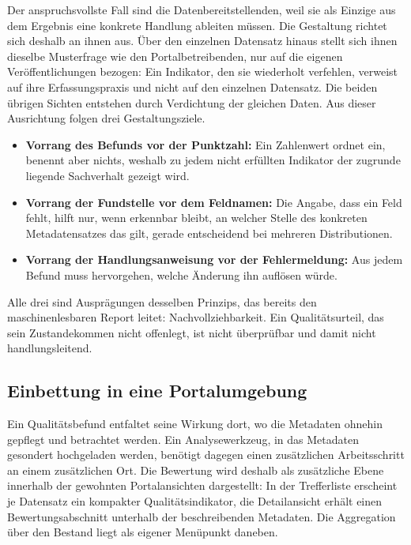 Der anspruchsvollste Fall sind die Datenbereitstellenden, weil sie als Einzige aus dem Ergebnis eine konkrete Handlung ableiten müssen. Die Gestaltung richtet sich deshalb an ihnen aus. Über den einzelnen Datensatz hinaus stellt sich ihnen dieselbe Musterfrage wie den Portalbetreibenden, nur auf die eigenen Veröffentlichungen bezogen: Ein Indikator, den sie wiederholt verfehlen, verweist auf ihre Erfassungspraxis und nicht auf den einzelnen Datensatz. Die beiden übrigen Sichten entstehen durch Verdichtung der gleichen Daten. Aus dieser Ausrichtung folgen drei Gestaltungsziele.

\begin{itemize}

    \item \textbf{Vorrang des Befunds vor der Punktzahl:} Ein Zahlenwert ordnet ein, benennt aber nichts, weshalb zu jedem nicht erfüllten Indikator der zugrunde liegende Sachverhalt gezeigt wird.
    
    \item \textbf{Vorrang der Fundstelle vor dem Feldnamen:} Die Angabe, dass ein Feld fehlt, hilft nur, wenn erkennbar bleibt, an welcher Stelle des konkreten Metadatensatzes das gilt, gerade entscheidend bei mehreren Distributionen.

    \item \textbf{Vorrang der Handlungsanweisung vor der Fehlermeldung:} Aus jedem Befund muss hervorgehen, welche Änderung ihn auflösen würde.
\end{itemize}

Alle drei sind Ausprägungen desselben Prinzips, das bereits den maschinenlesbaren Report leitet: Nachvollziehbarkeit. Ein Qualitätsurteil, das sein Zustandekommen nicht offenlegt, ist nicht überprüfbar und damit nicht handlungsleitend.

\subsection{Einbettung in eine Portalumgebung}

Ein Qualitätsbefund entfaltet seine Wirkung dort, wo die Metadaten ohnehin gepflegt und betrachtet werden. Ein Analysewerkzeug, in das Metadaten gesondert hochgeladen werden, benötigt dagegen einen zusätzlichen Arbeitsschritt an einem zusätzlichen Ort. Die Bewertung wird deshalb als zusätzliche Ebene innerhalb der gewohnten Portalansichten dargestellt: In der Trefferliste erscheint je Datensatz ein kompakter Qualitätsindikator, die Detailansicht erhält einen Bewertungsabschnitt unterhalb der beschreibenden Metadaten. Die Aggregation über den Bestand liegt als eigener Menüpunkt daneben.

